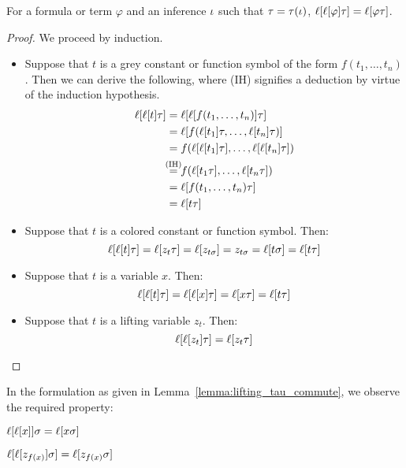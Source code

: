 \begin{lemma}
	\label{lemma:lifting_tau_commute}
	For a formula or term $\varphi$ and an inference $\iota$ such that $\tau = \tau(\iota)$,
	$\lifboth{\lifboth{ \varphi} \tau} =\nolinebreak \lifboth{ \varphi \tau } $.
\end{lemma}
\begin{proof}
	We proceed by induction.

	\begin{itemize}
		\item Suppose that $t$ is a grey constant or function symbol of the form $f(t_1, \dots, t_n)$.
			Then we can derive the following, where (IH) signifies a deduction by virtue of the induction hypothesis. 
			\begin{align*}
				\lifboth{\lifboth{t}\tau} &= \lifboth{\lifboth{ f(t_1, \dots, t_n)}\tau} \\
																							&= \lifboth{ f(\lifboth{t_1}\tau, \dots, \lifboth{t_n}\tau) } \\
																				&= f(\lifboth{\lifboth{t_1}\tau}, \dots, \lifboth{\lifboth{t_n}\tau}) \\
																		&\stackrel{\mathclap{\text{(IH)}}}= f(\lifboth{t_1\tau}, \dots, \lifboth{t_n\tau}) \\
																	 &= \lifboth{f(t_1, \dots, t_n)\tau} \\
																	 &= \lifboth{t\tau}
			\end{align*}
		\item Suppose that $t$ is a colored constant or function symbol. Then:
			\[
				\ell[\ell[t]\tau]= \ell[z_t\tau] 
				= \ell[z_{t\sigma}] 
				= z_{t\sigma} 
				= \ell[t\sigma] 
				= \ell[t\tau]
			\]
		\item Suppose that $t$ is a variable $x$. Then:
			\[
				\ell[\ell[t]\tau] = \ell[\ell[ x]\tau] = \ell[x\tau] = \ell[t\tau]
			\]
		\item Suppose that $t$ is a lifting variable $z_t$. Then:
			\[
				\ell[\ell[z_t]\tau] = \ell[z_t\tau] 
				\qedhere
			\]
	\end{itemize}

\end{proof}

\addtocounter{exa}{-2}
\begin{exa}[continued]
	In the formulation as given in Lemma~\ref{lemma:lifting_tau_commute}, we observe the required property:
	
	$\ell[ \ell[ x] ] \sigma = \ell[x \sigma]$

	$\ell[ \ell[ z_{f(x)} ] \sigma ] = \ell[z_{f(x)} \sigma]$

\end{exa}
\addtocounter{exa}{1}


